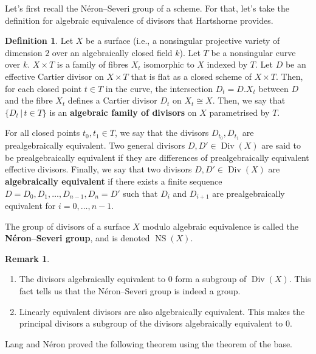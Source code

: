 \documentclass{report}
\DeclareMathOperator{\Div}{Div}
\DeclareMathOperator{\NS}{NS}
\theoremstyle{definition}
\newtheorem{definition}[equation]{Definition}
\newtheorem{remark}[equation]{Remark}
\begin{document}
Let's first recall the N\'{e}ron--Severi group of a scheme. For that, let's take the definition for algebraic equivalence of divisors that Hartshorne \cite[Exercise~V.7]{hartshorne1977algebraic} provides.

\begin{definition}
\label{def:neron-severi-group}
Let $X$ be a surface (i.e., a nonsingular projective variety of dimension $2$ over an algebraically closed field $k$). Let $T$ be a nonsingular curve over $k$. $X\times T$ is a family of fibres $X_t$ isomorphic to $X$ indexed by $T$. Let $D$ be an effective Cartier divisor on $X\times T$ that is flat as a closed scheme of $X\times T$. Then, for each closed point $t\in T$ in the curve, the intersection $D_t=D.X_t$ between $D$ and the fibre $X_t$ defines a Cartier divisor $D_t$ on $X_t\cong X$. Then, we say that $\{D_t\,|\,t\in T\}$ is an \textbf{algebraic family of divisors} on $X$ parametrised by $T$.

For all closed points $t_0,t_1\in T$, we say that the divisors $D_{t_0},D_{t_1}$ are prealgebraically equivalent. Two general divisors $D,D'\in\Div(X)$ are said to be prealgebraically equivalent if they are differences of prealgebraically equivalent effective divisors. Finally, we say that two divisors $D,D'\in\Div(X)$ are \textbf{algebraically equivalent} if there exists a finite sequence $D=D_0,D_1,\ldots,D_{n-1},D_n=D'$ such that $D_i$ and $D_{i+1}$ are prealgebraically equivalent for $i=0,\ldots,n-1$.

The group of divisors of a surface $X$ modulo algebraic equivalence is called the \textbf{N\'{e}ron--Severi group}, and is denoted $\NS(X)$.
\end{definition}

\begin{remark}
\begin{enumerate}
\item The divisors algebraically equivalent to $0$ form a subgroup of $\Div(X)$. This fact tells us that the N\'{e}ron--Severi group is indeed a group.

\item Linearly equivalent divisors are also algebraically equivalent. This makes the principal divisors a subgroup of the divisors algebraically equivalent to $0$.
\end{enumerate}
\end{remark}

Lang and N\'{e}ron \cite{lang1959rational} proved the following theorem using the theorem of the base.
\end{document}
